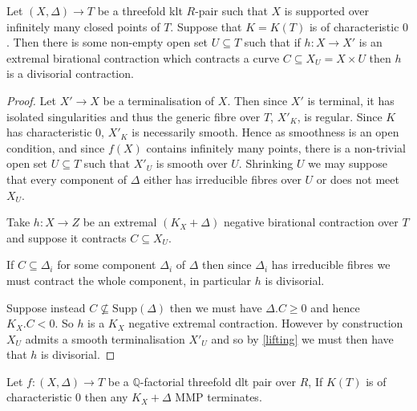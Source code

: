 \documentclass[a4paper,12pt]{amsart}
\begin{document}
	
	\begin{theorem}
		Let $(X,\Delta) \to T$ be a threefold klt $R$-pair such that $X$ is supported over infinitely many closed points of $T$. Suppose that $K=K(T)$ is of characteristic $0$. Then there is some non-empty open set $U \subseteq T$ such that if $h:X \to X'$ is an extremal birational contraction which contracts a curve $C\subseteq X_{U}=X\times U$ then $h$ is a divisorial contraction.
	\end{theorem}
	
	\begin{proof}
		
		Let $X' \to X$ be a terminalisation of $X$. Then since $X'$ is terminal, it has isolated singularities and thus the generic fibre over $T$, $X'_{K}$, is regular. Since $K$ has characteristic $0$, $X'_{K}$ is necessarily smooth. Hence as smoothness is an open condition, and since $f(X)$ contains infinitely many points, there is a non-trivial open set $U \subseteq T$ such that $X'_{U}$ is smooth over $U$. Shrinking $U$ we may suppose that every component of $\Delta$ either has irreducible fibres over $U$ or does not meet $X_{U}$. 
		
		Take $h:X \to Z$ be an extremal $(K_{X}+\Delta)$ negative birational contraction over $T$ and suppose it contracts $C \subseteq X_{U}$. 
		
		If $C \subseteq \Delta_{i}$ for some component $\Delta_{i}$ of $\Delta$ then since $\Delta_{i}$ has irreducible fibres we must contract the whole component, in particular $h$ is divisorial.
		
		Suppose instead $C \nsubseteq \text{Supp}(\Delta)$ then we must have $\Delta.C \geq 0$ and hence $K_{X}.C < 0$. So $h$ is a $K_{X}$ negative extremal contraction. However by construction $X_{U}$ admits a smooth terminalisation $X'_{U}$ and so by \autoref{lifting} we must then have that $h$ is divisorial.
	\end{proof}
	
	\begin{corollary}\label{termination}
		Let $f:(X,\Delta) \to T$ be a $\mathbb{Q}$-factorial threefold dlt pair over $R$, If $K(T)$ is of characteristic $0$ then any $K_{X}+\Delta$ MMP terminates.
	\end{corollary}
	
\end{document}
